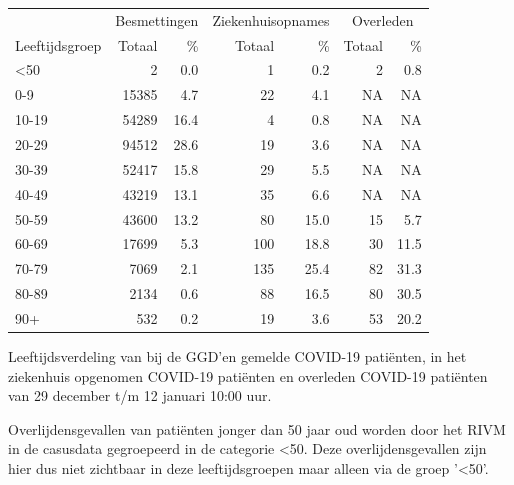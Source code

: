 \documentclass[
  english,
  man,floatsintext]{apa6}
\begin{document}
\begin{table}
\centering\begingroup\fontsize{11}{13}\selectfont

\begin{threeparttable}
\begin{tabular}{lrrrrrr}
\toprule
\multicolumn{1}{c}{ } & \multicolumn{2}{c}{Besmettingen} & \multicolumn{2}{c}{Ziekenhuisopnames} & \multicolumn{2}{c}{Overleden} \\
\cmidrule(l{3pt}r{3pt}){2-3} \cmidrule(l{3pt}r{3pt}){4-5} \cmidrule(l{3pt}r{3pt}){6-7}
Leeftijdsgroep & Totaal & \% & Totaal & \% & Totaal & \%\\
\midrule
<50 & 2 & 0.0 & 1 & 0.2 & 2 & 0.8\\
0-9 & 15385 & 4.7 & 22 & 4.1 & NA & NA\\
10-19 & 54289 & 16.4 & 4 & 0.8 & NA & NA\\
20-29 & 94512 & 28.6 & 19 & 3.6 & NA & NA\\
30-39 & 52417 & 15.8 & 29 & 5.5 & NA & NA\\
40-49 & 43219 & 13.1 & 35 & 6.6 & NA & NA\\
50-59 & 43600 & 13.2 & 80 & 15.0 & 15 & 5.7\\
60-69 & 17699 & 5.3 & 100 & 18.8 & 30 & 11.5\\
70-79 & 7069 & 2.1 & 135 & 25.4 & 82 & 31.3\\
80-89 & 2134 & 0.6 & 88 & 16.5 & 80 & 30.5\\
90+ & 532 & 0.2 & 19 & 3.6 & 53 & 20.2\\
\bottomrule
\end{tabular}
\begin{tablenotes}
\item[1] Leeftijdsverdeling van bij de GGD’en gemelde COVID-19 patiënten, in het ziekenhuis opgenomen COVID-19 patiënten en overleden COVID-19 patiënten van 29 december t/m 12 januari 10:00 uur.
\item[2] Overlijdensgevallen van patiënten jonger dan 50 jaar oud worden door het RIVM in de casusdata gegroepeerd in de categorie <50. Deze overlijdensgevallen zijn hier dus niet zichtbaar in deze leeftijdsgroepen maar alleen via de groep '<50'.
\end{tablenotes}
\end{threeparttable}
\endgroup{}
\end{table}

\newpage
\end{document}
